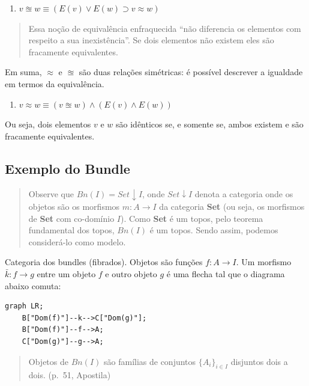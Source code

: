 \begin{enumerate}
\def\labelenumi{\arabic{enumi}.}
\tightlist
\item
  \(v \approxeq w \equiv (E(v) \lor E(w) \supset v \approx w)\)
\end{enumerate}

\begin{quote}
Essa noção de equivalência enfraquecida ``não diferencia os elementos
com respeito a sua inexistência''. Se dois elementos não existem eles
são fracamente equivalentes.
\end{quote}

Em suma, \(\approx\) e \(\approxeq\) são duas relações simétricas: é
possível descrever a igualdade em termos da equivalência.

\begin{enumerate}
\def\labelenumi{\arabic{enumi}.}
\setcounter{enumi}{3}
\tightlist
\item
  \(v \approx w \equiv (v \approxeq w) \land (E(v) \land E(w))\)
\end{enumerate}

Ou seja, dois elementos \(v\) e \(w\) são idênticos se, e somente se,
ambos existem e são fracamente equivalentes.

\hypertarget{exemplo-do-bundle}{%
\subsection{Exemplo do Bundle}\label{exemplo-do-bundle}}

\begin{quote}
Observe que \(Bn(I) = Set \downarrow I\), onde \(Set \downarrow I\)
denota a categoria onde os objetos são os morfismos
\(m : A \rightarrow I\) da categoria \textbf{Set} (ou seja, os morfismos
de \textbf{Set} com co-domínio \(I\)). Como \textbf{Set} é um topos,
pelo teorema fundamental dos topos, \(Bn(I)\) é um topos. Sendo assim,
podemos considerá-lo como modelo.
\end{quote}

Categoria dos bundles (fibrados). Objetos são funções
\(f : A \rightarrow I\). Um morfismo \(\bar{k} : f \rightarrow g\) entre
um objeto \(f\) e outro objeto \(g\) é uma flecha tal que o diagrama
abaixo comuta:

\begin{verbatim}
graph LR;
    B["Dom(f)"]--k-->C["Dom(g)"];
    B["Dom(f)"]--f-->A;
    C["Dom(g)"]--g-->A;
\end{verbatim}

\begin{quote}
Objetos de \(Bn(I)\) são famílias de conjuntos \(\{ A_i \}_{i \in I}\)
disjuntos dois a dois. (p.~51, Apostila)
\end{quote}

